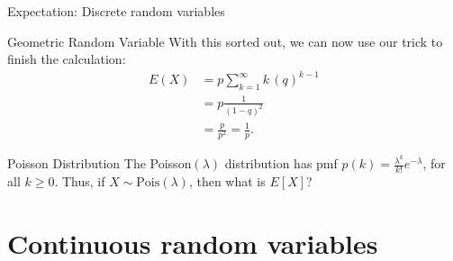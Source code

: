 \begin{frame}[allowframebreaks]{Expectation: Discrete random variables}
\begin{exampleblock}{Geometric Random Variable}
{  With this sorted out, we can now use our trick to finish the calculation:
  \begin{align*}
    E(X) &= p \sum_{k = 1}^{\infty} k \, (q)^{k-1} \\
         &= p\frac{1}{(1 - q)^2} \\
         &= \frac{p}{p^2} = \frac{1}{p}.
  \end{align*}
  }
  \end{exampleblock}
  
  
  \framebreak
  
  \begin{exampleblock}{Poisson Distribution}
    The Poisson$(\lambda)$ distribution has pmf $p(k) = \frac{\lambda^k}{k!}e^{-\lambda}$, for all $k \geq 0$. Thus, if $X \sim \text{Pois}(\lambda)$, then what is $E[X]$? 
  \end{exampleblock}
  
  
  \end{frame}

  \section{Continuous random variables}

